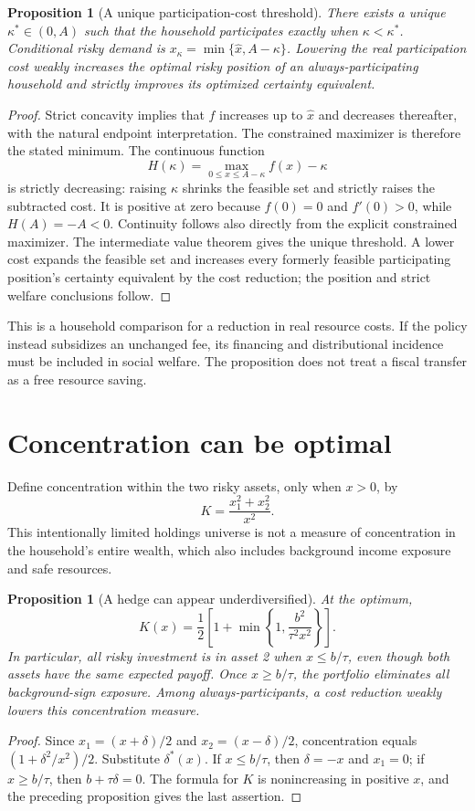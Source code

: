 \documentclass[11pt,a4paper]{article}
\newtheorem{proposition}[theorem]{Proposition}
\theoremstyle{definition}
\theoremstyle{remark}
\begin{document}
\begin{proposition}[A unique participation-cost threshold]
There exists a unique $\kappa^*\in(0,A)$ such that the household participates exactly when $\kappa<\kappa^*$. Conditional risky demand is $x_\kappa=\min\{\hat x,A-\kappa\}$. Lowering the real participation cost weakly increases the optimal risky position of an always-participating household and strictly improves its optimized certainty equivalent.
\end{proposition}
\begin{proof}
Strict concavity implies that $f$ increases up to $\hat x$ and decreases thereafter, with the natural endpoint interpretation. The constrained maximizer is therefore the stated minimum. The continuous function
\[
 H(\kappa)=\max_{0\leq x\leq A-\kappa}f(x)-\kappa
\]
is strictly decreasing: raising $\kappa$ shrinks the feasible set and strictly raises the subtracted cost. It is positive at zero because $f(0)=0$ and $f'(0)>0$, while $H(A)=-A<0$. Continuity follows also directly from the explicit constrained maximizer. The intermediate value theorem gives the unique threshold. A lower cost expands the feasible set and increases every formerly feasible participating position's certainty equivalent by the cost reduction; the position and strict welfare conclusions follow.
\end{proof}

This is a household comparison for a reduction in real resource costs. If the policy instead subsidizes an unchanged fee, its financing and distributional incidence must be included in social welfare. The proposition does not treat a fiscal transfer as a free resource saving.

\section{Concentration can be optimal}
Define concentration within the two risky assets, only when $x>0$, by
\[
 K=\frac{x_1^2+x_2^2}{x^2}.
\]
This intentionally limited holdings universe is not a measure of concentration in the household's entire wealth, which also includes background income exposure and safe resources.

\begin{proposition}[A hedge can appear underdiversified]
At the optimum,
\[
 K(x)=\frac12\left[1+\min\left\{1,\frac{b^2}{\tau^2x^2}\right\}\right].
\]
In particular, all risky investment is in asset 2 when $x\leq b/\tau$, even though both assets have the same expected payoff. Once $x\geq b/\tau$, the portfolio eliminates all background-sign exposure. Among always-participants, a cost reduction weakly lowers this concentration measure.
\end{proposition}
\begin{proof}
Since $x_1=(x+\delta)/2$ and $x_2=(x-\delta)/2$, concentration equals $(1+\delta^2/x^2)/2$. Substitute $\delta^*(x)$. If $x\leq b/\tau$, then $\delta=-x$ and $x_1=0$; if $x\geq b/\tau$, then $b+\tau\delta=0$. The formula for $K$ is nonincreasing in positive $x$, and the preceding proposition gives the last assertion.
\end{proof}
\end{document}
